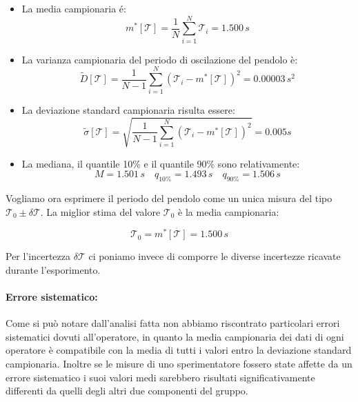 \begin{itemize}
    \item{La media campionaria é:}
        \begin{equation*}
            m^*[\mathcal{T}] = \frac{1}{N} \sum_{i=1}^{N} \mathcal{T}_i = 1.500\,s
        \end{equation*} 

    \item{La varianza campionaria del periodo di oscilazione del pendolo è:}
        \begin{equation*}
            \tilde{D}[\mathcal{T}] = \frac{1}{N - 1} \sum_{i=1}^{N} (\mathcal{T}_i - m^*[\mathcal{T}])^2 = 0.00003\,s^2
        \end{equation*}

    \item{La deviazione standard campionaria risulta essere:}
        \begin{equation*}
            \tilde{\sigma}[\mathcal{T}] = \sqrt{\frac{1}{N - 1} \sum_{i=1}^{N} (\mathcal{T}_i - m^*[\mathcal{T}])^2} = 0.005 s
        \end{equation*}

    \item{La mediana, il quantile 10\% e il quantile 90\% sono relativamente:}
        \begin{equation*}
            M = 1.501\,s \quad
            q_{10\%} = 1.493\,s \quad
            q_{90\%} = 1.506\,s
        \end{equation*}
\end{itemize}

Vogliamo ora esprimere il periodo del pendolo come un unica misura del tipo $\mathcal{T}_0 \pm \delta\mathcal{T}$.
La miglior stima del valore $\mathcal{T}_0$ è la media campionaria:

\begin{equation*}
	\mathcal{T}_0 = m^*[\mathcal{T}] = 1.500 \,s
\end{equation*}

Per l'incertezza $\delta\mathcal{T}$ ci poniamo invece di comporre le
diverse incertezze ricavate durante l'esporimento.

\paragraph{Errore sistematico:}
Come si può notare dall'analisi fatta non abbiamo riscontrato particolari errori sistematici dovuti all'operatore,
in quanto la media campionaria dei dati di ogni operatore è compatibile con la media di tutti i valori entro
la deviazione standard campionaria. Inoltre se le misure di uno sperimentatore fossero state affette da un
errore sistematico i suoi valori medi sarebbero risultati significativamente differenti da quelli degli altri due componenti del gruppo.

